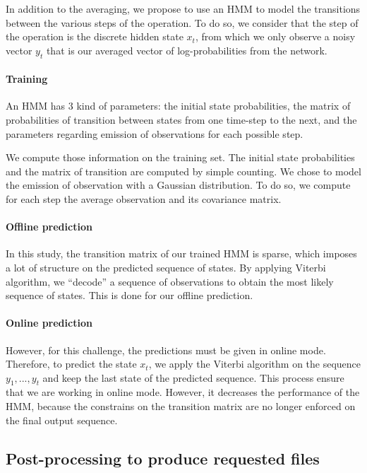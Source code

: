 \documentclass[10pt,twocolumn,letterpaper]{article}
\begin{document}
In addition to the averaging, we propose to use an HMM to model the transitions
between the various steps of the operation. To do so, we consider that the step of the operation is the discrete hidden state $x_t$,
from which we only observe a noisy vector $y_t$ that is our averaged vector of log-probabilities from
the network.

\paragraph{Training} An HMM has 3 kind of parameters: the initial state probabilities, the matrix of probabilities of transition between states from one time-step to the next, and the parameters regarding emission of observations for each possible step.

We compute those information on the training set. The initial state probabilities and the matrix of transition are computed by simple counting. We chose to model the emission of
observation with a Gaussian distribution. To do so, we compute for each step the average observation and its covariance matrix.

\paragraph{Offline prediction} In this study, the transition matrix of our trained HMM is sparse, which imposes a lot of structure on the predicted sequence of states. By applying Viterbi algorithm, we ``decode'' a sequence of observations to obtain the most likely sequence of states. This is done for our offline prediction.

\paragraph{Online prediction} However, for this challenge, the predictions must
be given in online mode. Therefore, to predict the state $x_t$, we apply the Viterbi algorithm on the sequence $y_1,...,y_t$ and keep the last state of the predicted sequence. This process ensure that we are working in online mode. However, it decreases the performance of the HMM, because the constrains on the transition matrix are no longer enforced on the final output sequence.

\subsection{Post-processing to produce requested files}
\end{document}
